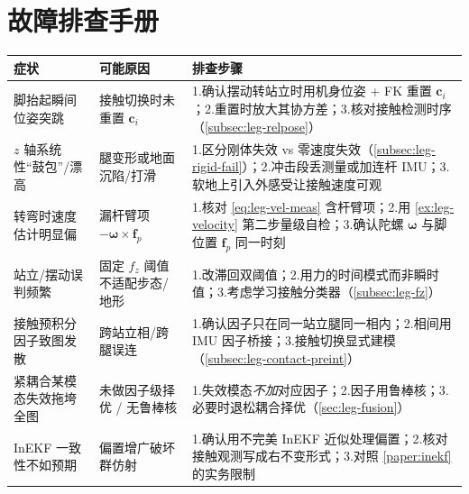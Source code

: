 \section*{故障排查手册}
\begin{table}[H]\centering\small
\begin{tabular}{p{} p{} p{}}
\toprule
症状 & 可能原因 & 排查步骤 \\
\midrule
脚抬起瞬间位姿突跳 & 接触切换时未重置 $\mathbf{c}_i$ & 1.确认摆动转站立时用机身位姿 + FK 重置 $\mathbf{c}_i$；2.重置时放大其协方差；3.核对接触检测时序（\cref{subsec:leg-relpose}）\\
$z$ 轴系统性“鼓包”/漂高 & 腿变形或地面沉陷/打滑 & 1.区分刚体失效 vs 零速度失效（\cref{subsec:leg-rigid-fail}）；2.冲击段丢测量或加连杆 IMU；3.软地上引入外感受让接触速度可观 \\
转弯时速度估计明显偏 & 漏杆臂项 $-\boldsymbol{\omega}\times\mathbf{f}_p$ & 1.核对 \cref{eq:leg-vel-meas} 含杆臂项；2.用 \cref{ex:leg-velocity} 第二步量级自检；3.确认陀螺 $\boldsymbol{\omega}$ 与脚位置 $\mathbf{f}_p$ 同一时刻 \\
站立/摆动误判频繁 & 固定 $f_z$ 阈值不适配步态/地形 & 1.改滞回双阈值；2.用力的时间模式而非瞬时值；3.考虑学习接触分类器（\cref{subsec:leg-fz}）\\
接触预积分因子致图发散 & 跨站立相/跨腿误连 & 1.确认因子只在同一站立腿同一相内；2.相间用 IMU 因子桥接；3.接触切换显式建模（\cref{subsec:leg-contact-preint}）\\
紧耦合某模态失效拖垮全图 & 未做因子级择优 / 无鲁棒核 & 1.失效模态\emph{不加}对应因子；2.因子用鲁棒核；3.必要时退松耦合择优（\cref{sec:leg-fusion}）\\
InEKF 一致性不如预期 & 偏置增广破坏群仿射 & 1.确认用不完美 InEKF 近似处理偏置；2.核对接触观测写成右不变形式；3.对照 \cref{paper:inekf} 的实务限制 \\
\bottomrule
\end{tabular}
\end{table}


